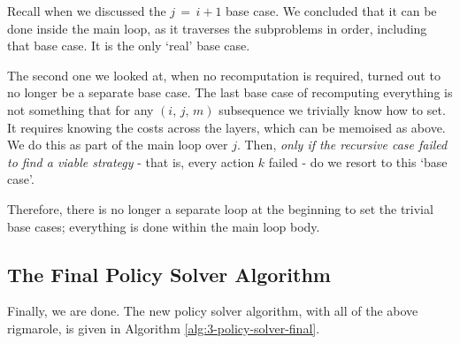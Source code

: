 Recall when we discussed the \(j\,=\,i+1\) base case.
We concluded that it can be done inside the main loop, as it traverses the subproblems in order, including that base case.
It is the only `real' base case.

The second one we looked at, when no recomputation is required, turned out to no longer be a separate base case.
The last base case of recomputing everything is not something that for any \((i,\,j,\,m)\) subsequence we trivially know how to set.
It requires knowing the costs across the layers, which can be memoised as above.
We do this as part of the main loop over \(j\).
Then, \textit{only if the recursive case failed to find a viable strategy} - that is, every action \(k\) failed - do we resort to this `base case'.

Therefore, there is no longer a separate loop at the beginning to set the trivial base cases; everything is done within the main loop body.

\subsection{The Final Policy Solver Algorithm}
Finally, we are done.
The new policy solver algorithm, with all of the above rigmarole, is given in Algorithm \ref{alg:3-policy-solver-final}.

